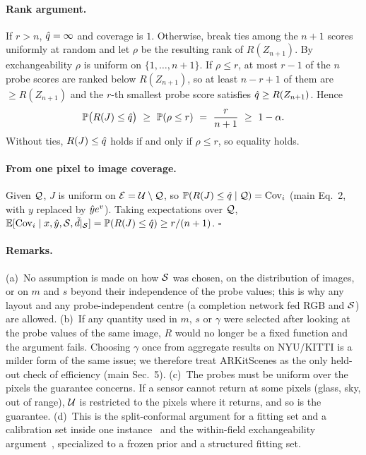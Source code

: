 \documentclass[10pt,twocolumn,letterpaper]{article}
\begin{document}
\paragraph{Rank argument.}
If $r>n$, $\hat{q}=\infty$ and coverage is $1$.
Otherwise, break ties among the $n+1$ scores uniformly at random and let $\rho$ be the resulting rank of $R(Z_{n+1})$.
By exchangeability $\rho$ is uniform on $\{1,\dots,n+1\}$.
If $\rho\le r$, at most $r-1$ of the $n$ probe scores are ranked below $R(Z_{n+1})$, so at least $n-r+1$ of them are $\ge R(Z_{n+1})$ and the $r$-th smallest probe score satisfies $\hat{q}\ge R(Z_{n+1})$.
Hence
\begin{equation}
\P\big(R(J)\le\qhat\big)\ \ge\ \P(\rho\le r)\ =\ \frac{r}{n+1}\ \ge\ 1-\alpha .
\end{equation}
Without ties, $R(J)\le\hat{q}$ holds if and only if $\rho\le r$, so equality holds.

\paragraph{From one pixel to image coverage.}
Given $\mathcal{Q}$, $J$ is uniform on $\mathcal{E}=\mathcal{U}\setminus\mathcal{Q}$, so $\mathbb{P}(R(J)\le\hat{q}\mid\mathcal{Q})=\mathrm{Cov}_i$ (main Eq.~2, with $y$ replaced by $\hat{y} e^{v}$). Taking expectations over $\mathcal{Q}$,
$\mathbb{E}[\mathrm{Cov}_i\mid x,\hat{y},\mathcal{S},\tilde{d}|_{\mathcal{S}}]=\mathbb{P}(R(J)\le\hat{q})\ge r/(n+1)$. \hfill$\square$

\paragraph{Remarks.}
(a)~No assumption is made on how $\mathcal{S}$ was chosen, on the distribution of images, or on $m$ and $s$ beyond their independence of the probe values; this is why any layout and any probe-independent centre (\eg a completion network fed RGB and $\mathcal{S}$) are allowed.
(b)~If any quantity used in $m$, $s$ or $\gamma$ were selected after looking at the probe values of the same image, $R$ would no longer be a fixed function and the argument fails. Choosing $\gamma$ once from aggregate results on NYU/KITTI is a milder form of the same issue; we therefore treat ARKitScenes as the only held-out check of efficiency (main Sec.~5).
(c)~The probes must be uniform over the pixels the guarantee concerns. If a sensor cannot return at some pixels (glass, sky, out of range), $\mathcal{U}$ is restricted to the pixels where it returns, and so is the guarantee.
(d)~This is the split-conformal argument for a fitting set and a calibration set inside one instance~\cite{gui2023cmc} and the within-field exchangeability argument~\cite{mao2024spatial}, specialized to a frozen prior and a structured fitting set.
\end{document}
